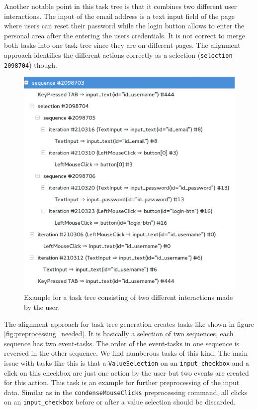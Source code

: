 Another notable point in this task tree is that it combines two different user interactions. 
The input of the email address is a text input field of the page where users can reset their password while the login button allows to enter the personal area 
after the entering the users credentials. It is not correct to merge both tasks into one task tree since they are on different pages.
The alignment approach identifies the different actions correctly as a selection (\texttt{selection 2098704}) though. 

\begin{figure}[h]
	\centering
	\includegraphics[scale=0.75]{chapters/casestudy/mixedtasktree.png}
	\caption{Example for a task tree consisting of two different interactions made by the user. }
	\label{fig:mixedtasktree}
\end{figure}

The alignment approach for task tree generation creates tasks like shown in figure \ref{fig:preprocessing_needed}.
It is basically a selection of two sequences, each sequence has two event-tasks. 
The order of the event-tasks in one sequence is reversed in the other sequence.
We find numberous tasks of this kind.
The main issue with tasks like this is that a \texttt{ValueSelection} on an \texttt{input\_checkbox} and a click on this checkbox are just one action by the user but two events are created for this action.
This task is an example for further preprocessing of the input data. 
Similar as in the \texttt{condenseMouseClicks} preprocessing command, all clicks on an \texttt{input\_checkbox} before or after a value selection should be discarded.

